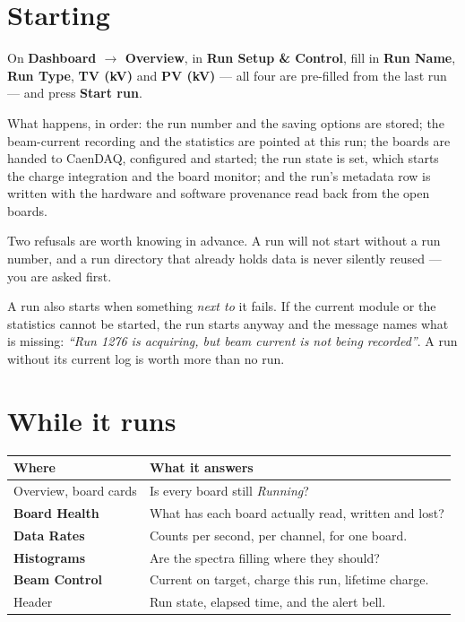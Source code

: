\documentclass[11pt,a4paper]{report}
\newcommand{\ui}[1]{\textbf{#1}}          %
\begin{document}
\section{Starting}

On \ui{Dashboard $\rightarrow$ Overview}, in \ui{Run Setup \& Control}, fill in
\ui{Run Name}, \ui{Run Type}, \ui{TV (kV)} and \ui{PV (kV)} --- all four are
pre-filled from the last run --- and press \ui{Start run}.

What happens, in order: the run number and the saving options are stored; the
beam-current recording and the statistics are pointed at this run; the boards are
handed to CaenDAQ, configured and started; the run state is set, which starts the
charge integration and the board monitor; and the run's metadata row is written
with the hardware and software provenance read back from the open boards.

Two refusals are worth knowing in advance. A run will not start without a run
number, and a run directory that already holds data is never silently reused ---
you are asked first.

A run also starts when something \emph{next to} it fails. If the current module
or the statistics cannot be started, the run starts anyway and the message names
what is missing: \emph{``Run 1276 is acquiring, but beam current is not being
recorded''}. A run without its current log is worth more than no run.

\section{While it runs}

\begin{center}
\begin{tabular}{@{}L{0.30\textwidth}L{0.62\textwidth}@{}}
\toprule
\textbf{Where} & \textbf{What it answers} \\
\midrule
Overview, board cards & Is every board still \emph{Running}? \\
\ui{Board Health} & What has each board actually read, written and lost? \\
\ui{Data Rates} & Counts per second, per channel, for one board. \\
\ui{Histograms} & Are the spectra filling where they should? \\
\ui{Beam Control} & Current on target, charge this run, lifetime charge. \\
Header & Run state, elapsed time, and the alert bell. \\
\bottomrule
\end{tabular}
\end{center}
\end{document}
